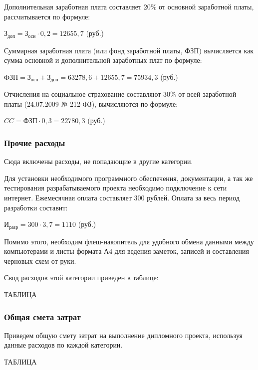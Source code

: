 Дополнительная заработная плата составляет 20\% от основной заработной платы, рассчитывается по формуле:
\begin{center}
$ \text{З}_\text{доп} = \text{З}_\text{осн} \cdot 0,2 = 12655,7 $ (руб.)
\end{center}

Суммарная заработная плата (или фонд заработной платы, ФЗП) вычисляется как сумма основной и дополнительной заработных плат по формуле:

\begin{center}
$ \text{ФЗП} = \text{З}_\text{осн} + \text{З}_\text{доп} = 63278,6 + 12655,7 = 75934,3$ (руб.)
\end{center}

Отчисления на социальное страхование составляют 30\% от всей заработной платы (24.07.2009 № 212-ФЗ), вычисляются по формуле:

\begin{center}
$ CC = \text{ФЗП} \cdot 0,3 = 22780,3$ (руб.)
\end{center}

\subsubsection{Прочие расходы}
Сюда включены расходы, не попадающие в другие категории.

Для установки необходимого программного обеспечения, документации, а так же тестирования разрабатываемого проекта необходимо подключение к сети интернет. Ежемесячная оплата составляет 300 рублей. Оплата за весь период разработки составит:

\begin{center}
$ \text{И}_\text{разр} = 300 \cdot 3,7 = 1110$ (руб.)
\end{center}

Помимо этого, необходим флеш-накопитель для удобного обмена данными между компьютерами и листы формата А4 для ведения заметок, записей и составления черновых схем от руки.

Свод расходов этой категории приведен в таблице:

ТАБЛИЦА

\subsubsection{Общая смета затрат}
Приведем общую смету затрат на выполнение дипломного проекта, используя данные расходов по каждой категории.

ТАБЛИЦА


